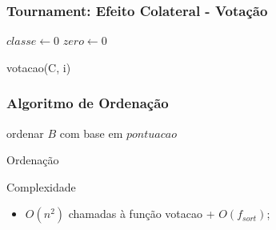 \begin{frame}
    \frametitle{Tournament: Efeito Colateral - Votação}

    \begin{function}[H]
        $classe \gets 0$\;
        $zero \gets 0$\;




        \caption{votacao(C, i)}
    \end{function}
\end{frame}

\begin{frame}
    \frametitle{Algoritmo de Ordenação}

    \begin{algorithm}[H]

        ordenar $B$ com base em $pontuacao$

        \caption{Ordenação}
    \end{algorithm}

    \begin{block}{Complexidade}
        \begin{itemize}
            \item $O(n^2)$ chamadas à função votacao + $O(f_{sort})$;
        \end{itemize}
    \end{block}
\end{frame}